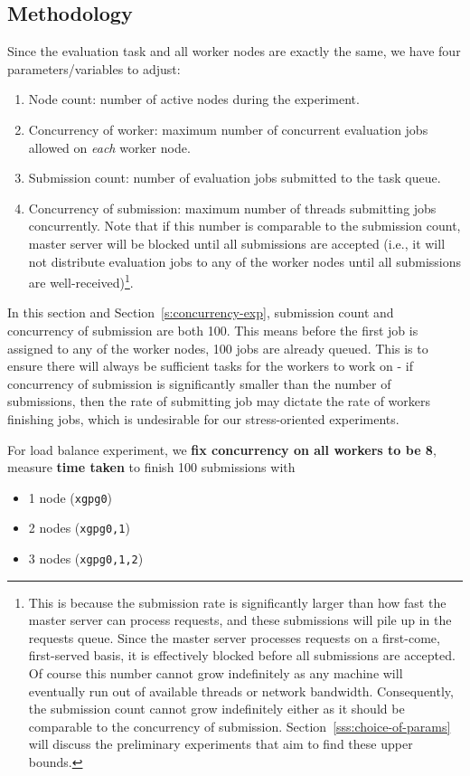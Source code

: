 \subsection{Methodology}
\label{ss:lb-exp-meth}
Since the evaluation task and all worker nodes are exactly the same, we have four parameters/variables to adjust:
\begin{enumerate}
    \item Node count: number of active nodes during the experiment.
    \item Concurrency of worker: maximum number of concurrent evaluation jobs allowed on \emph{each} worker node.
    \item Submission count: number of evaluation jobs submitted to the task queue.
    \item Concurrency of submission: maximum number of threads submitting jobs concurrently. Note that if this number is comparable to the submission count, master server will be blocked until all submissions are accepted (i.e., it will not distribute evaluation jobs to any of the worker nodes until all submissions are well-received)\footnote{This is because the submission rate is significantly larger than how fast the master server can process requests, and these submissions will pile up in the requests queue. Since the master server processes requests on a first-come, first-served basis, it is effectively blocked before all submissions are accepted. Of course this number cannot grow indefinitely as any machine will eventually run out of available threads or network bandwidth. Consequently, the submission count cannot grow indefinitely either as it should be comparable to the concurrency of submission. Section~\ref{sss:choice-of-params} will discuss the preliminary experiments that aim to find these upper bounds.\label{fn:concurrency-of-submission}}.
\end{enumerate}

In this section and Section~\ref{s:concurrency-exp}, submission count and concurrency of submission are both 100. This means before the first job is assigned to any of the worker nodes, 100 jobs are already queued. This is to ensure there will always be sufficient tasks for the workers to work on - if concurrency of submission is significantly smaller than the number of submissions, then the rate of submitting job may dictate the rate of workers finishing jobs, which is undesirable for our stress-oriented experiments.

For load balance experiment, we \textbf{fix concurrency on all workers to be 8}, measure \textbf{time taken} to finish 100 submissions with
\begin{itemize}
    \item 1 node (\texttt{xgpg0})
    \item 2 nodes (\texttt{xgpg0,1})
    \item 3 nodes (\texttt{xgpg0,1,2})
\end{itemize}

